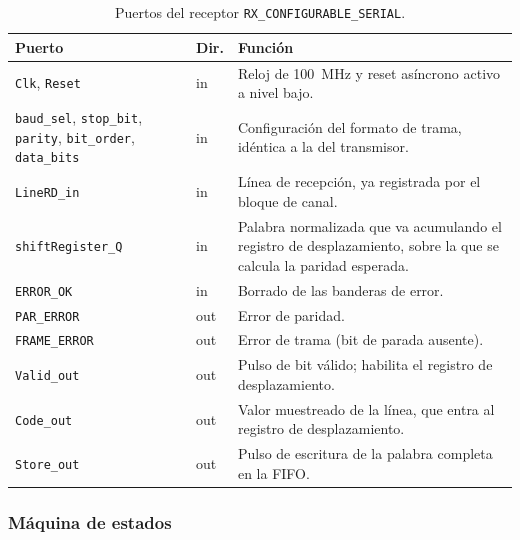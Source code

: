 \begin{table}[H]
    \centering
    \begin{tabular}{p{}lp{}}
        \hline
        \textbf{Puerto} & \textbf{Dir.} & \textbf{Función} \\
        \hline
        \texttt{Clk}, \texttt{Reset}    & in  & Reloj de 100~MHz y reset asíncrono activo a nivel
                                                bajo. \\
        \texttt{baud\_sel}, \texttt{stop\_bit}, \texttt{parity}, \texttt{bit\_order},
        \texttt{data\_bits}             & in  & Configuración del formato de trama, idéntica a la
                                                del transmisor. \\
        \texttt{LineRD\_in}             & in  & Línea de recepción, ya registrada por el bloque de
                                                canal. \\
        \texttt{shiftRegister\_Q}       & in  & Palabra normalizada que va acumulando el registro
                                                de desplazamiento, sobre la que se calcula la
                                                paridad esperada. \\
        \texttt{ERROR\_OK}              & in  & Borrado de las banderas de error. \\
        \texttt{PAR\_ERROR}             & out & Error de paridad. \\
        \texttt{FRAME\_ERROR}           & out & Error de trama (bit de parada ausente). \\
        \texttt{Valid\_out}             & out & Pulso de bit válido; habilita el registro de
                                                desplazamiento. \\
        \texttt{Code\_out}              & out & Valor muestreado de la línea, que entra al registro
                                                de desplazamiento. \\
        \texttt{Store\_out}             & out & Pulso de escritura de la palabra completa en la
                                                FIFO. \\
        \hline
    \end{tabular}
    \caption{Puertos del receptor \texttt{RX\_CONFIGURABLE\_SERIAL}.}
    \label{tab:rx_puertos}
\end{table}

\subsubsection{Máquina de estados}

